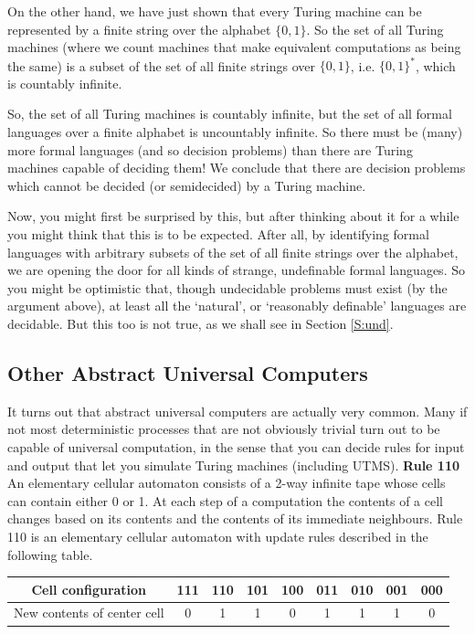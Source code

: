 \documentclass{article}
\theoremstyle{plain}
\theoremstyle{definition}
\begin{document}
On the other hand, we have just shown that every Turing machine can be represented by a finite string over the alphabet $\{0,1\}$. So the set of all Turing machines (where we count machines that make equivalent computations as being the same) is a subset of the set of all finite strings over $\{0,1\}$, i.e. $\{0,1\}^*$, which is countably infinite. 

So, the set of all Turing machines is countably infinite, but the set of all formal languages over a finite alphabet is uncountably infinite. So there must be (many) more formal languages (and so decision problems) than there are Turing machines capable of deciding them! We conclude that there are decision problems which cannot be decided (or semidecided) by a Turing machine. 

Now, you might first be surprised by this, but after thinking about it for a while you might think that this is to be expected. After all, by identifying formal languages with arbitrary subsets of the set of all finite strings  over the alphabet, we are opening the door for all kinds of strange, undefinable formal languages. So you might be optimistic that, though undecidable problems must exist (by the argument above), at least all the `natural', or `reasonably definable' languages are decidable. But this too is not true, as we shall see in Section \ref{S:und}. 


\subsection{Other Abstract Universal Computers}
It turns out that abstract universal computers are actually very common. Many if not most deterministic processes that are not obviously trivial turn out to be capable of universal computation, in the sense that you can decide rules for input and output that let you simulate Turing machines (including UTMS). 
\newline
\newline
\textbf{Rule 110}\\
An elementary cellular automaton consists of a 2-way infinite tape whose cells can contain either 0 or 1. At each step of a computation the contents of a cell changes based on its contents and the contents of its immediate neighbours. Rule 110 is an elementary cellular automaton with update rules described in the following table.

\begin{center}
\begin{tabular}{| c |c |c |c |c |c |c |c |c|}
\hline
 Cell configuration          & 111 & 110 & 101 & 100 & 011 & 010 & 001 & 000 \\\hline 
 New contents of center cell &  0  &  1  &  1  &  0  &  1  &  1  &  1  &  0\\ \hline   
\end{tabular}
\end{center}
\end{document}
